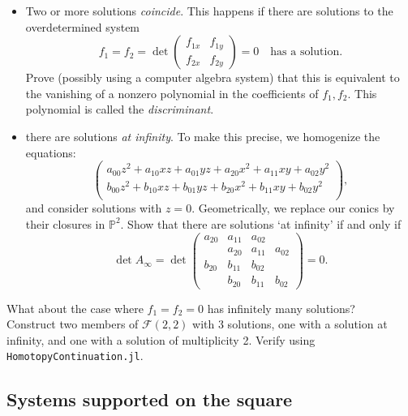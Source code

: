 \documentclass[11pt,reqno]{amsart}
\theoremstyle{definition}
\theoremstyle{remark}
\numberwithin{equation}{section}
\begin{document}
\begin{itemize} 
\item Two or more solutions \emph{coincide}. This happens if there are solutions to the overdetermined system
$$ f_1 = f_2 = \det \begin{pmatrix} f_{1x} & f_{1y} \\ f_{2x} & f_{2y} \end{pmatrix} = 0 \quad \text{has a solution}.$$
Prove (possibly using a computer algebra system) that this is equivalent to the vanishing of a nonzero polynomial in the coefficients of $f_1, f_2$. This polynomial is called the \emph{discriminant}. 
\item there are solutions \emph{at infinity}. To make this precise, we homogenize the equations:
$$\begin{pmatrix}
a_{00} z^2+ a_{10} x z+ a_{01} yz + a_{20}x^2 + a_{11}xy + a_{02} y^2 \\
b_{00} z^2 + b_{10} x z + b_{01} yz + b_{20}x^2 + b_{11}xy + b_{02} y^2 \\
\end{pmatrix},$$
and consider solutions with $z = 0$. Geometrically, we replace our conics by their closures in $\mathbb{P}^2$. Show that there are solutions `at infinity' if and only if
$$ \det A_\infty = \det \begin{pmatrix} a_{20} & a_{11} & a_{02} & \\ & a_{20} & a_{11} & a_{02} \\ b_{20} & b_{11} & b_{02} & \\ & b_{20} & b_{11} & b_{02} \end{pmatrix} = 0.$$
\end{itemize}
What about the case where $f_1 = f_2 = 0$ has infinitely many solutions? \\

Construct two members of $\mathcal{F}(2,2)$ with 3 solutions, one with a solution at infinity, and one with a solution of multiplicity 2. Verify using \texttt{HomotopyContinuation.jl}.

\subsection{Systems supported on the square}
\end{document}
